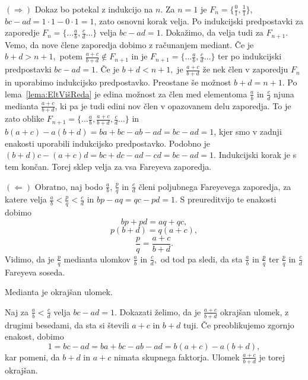 \documentclass[mat1]{fmfdelo}
\begin{document}
\begin{dokaz}
$(\Rightarrow)$ Dokaz bo potekal z indukcijo na $n$.
Za $n=1$ je $F_n = \{\frac{0}{1}, \frac{1}{1}\}$, $bc - ad = 1\cdot1 - 0\cdot1 = 1$, zato osnovni korak velja.
Po indukcijski predpostavki za zaporedje \( F_n = \{\ldots \frac{a}{b}, \frac{c}{d} \ldots \} \) velja $bc - ad = 1$. Dokažimo, da velja tudi za $F_{n+1}$. Vemo, da nove člene zaporedja dobimo z računanjem mediant. Če je $b+d > n+1,$ potem $\frac{a+c}{b+d} \notin F_{n+1}$ in je \( F_{n+1} = \{\ldots \frac{a}{b}, \frac{c}{d} \ldots \} \) ter po indukcijski predpostavki $bc - ad = 1$. 
Če je $b+d < n+1,$ je $\frac{a+c}{b+d}$ že nek člen v zaporedju $F_n$ in uporabimo indukcijsko predpostavko. 
Preostane še možnost $b+d = n+1$. Po lema~\ref{lema:EltVišReda} je edina možnost za člen med elementoma $\frac{a}{b}$ in $\frac{c}{d}$ njuna medianta $\frac{a+c}{b+d}$, ki pa je tudi edini nov člen v opazovanem delu zaporedja. To je zato oblike \( F_{n+1} = \{\ldots \frac{a}{b}, \frac{a+c}{b+d}, \frac{c}{d} \ldots \} \) in $b(a + c) - a(b + d) = ba + bc - ab - ad = bc - ad = 1$, kjer smo v zadnji enakosti uporabili indukcijsko predpostavko. Podobno je $(b + d)c - (a + c)d = bc + dc - ad - cd = bc - ad = 1$. Indukcijski korak je s tem končan. Torej sklep velja za vsa Fareyeva zaporedja.

$(\Leftarrow)$ Obratno, naj bodo $\frac{a}{b}$, $\frac{p}{q}$ in $\frac{c}{d}$ členi poljubnega Fareyevega zaporedja, za katere velja $\frac{a}{b} <\frac{p}{q} < \frac{c}{d}$ in $bp - aq = qc - pd = 1$. S preureditvijo te enakosti dobimo
\[ bp + pd = aq + qc, \]
\[ p(b + d) = q(a + c), \]
\[ \frac{p}{q} = \frac{a+c}{b+d}. \]
Vidimo, da je $\frac{p}{q}$ medianta ulomkov $\frac{a}{b}$ in $\frac{c}{d},$ od tod pa sledi, da sta $\frac{a}{b}$ in $\frac{p}{q}$ ter $\frac{p}{q}$ in $\frac{c}{d}$ Fareyeva soseda.
\end{dokaz}

\begin{lema}
\label{lema:MediantaOkrUlom}
Medianta je okrajšan ulomek.
\end{lema}

\begin{dokaz}
Naj za $\frac{a}{b} < \frac{c}{d}$ velja $bc - ad = 1$. Dokazati želimo, da je $\frac{a+c}{b+d}$ okrajšan ulomek, z drugimi besedami, da sta si števili $a+c$ in $b+d$ tuji. Če preoblikujemo zgornjo enakost, dobimo 
\[ 1 = bc - ad = ba + bc - ab - ad = b(a + c) - a(b + d), \]
kar pomeni, da $b+d$ in $a+c$ nimata skupnega faktorja. Ulomek $\frac{a+c}{b+d}$ je torej okrajšan.
\end{dokaz}
\end{document}

